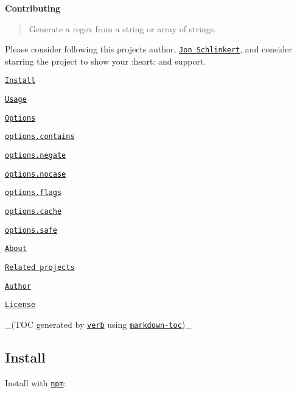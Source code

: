 {\bfseries Contributing}

\begin{quote}
Generate a regex from a string or array of strings. \end{quote}


Please consider following this project\textquotesingle{}s author, \href{https://github.com/jonschlinkert}{\tt Jon Schlinkert}, and consider starring the project to show your \+:heart\+: and support.


\begin{DoxyItemize}
\item \href{#install}{\tt Install}
\item \href{#usage}{\tt Usage}
\item \href{#options}{\tt Options}
\begin{DoxyItemize}
\item \href{#optionscontains}{\tt options.\+contains}
\item \href{#optionsnegate}{\tt options.\+negate}
\item \href{#optionsnocase}{\tt options.\+nocase}
\item \href{#optionsflags}{\tt options.\+flags}
\item \href{#optionscache}{\tt options.\+cache}
\item \href{#optionssafe}{\tt options.\+safe}
\end{DoxyItemize}
\item \href{#about}{\tt About}
\begin{DoxyItemize}
\item \href{#related-projects}{\tt Related projects}
\item \href{#author}{\tt Author}
\item \href{#license}{\tt License}
\end{DoxyItemize}
\end{DoxyItemize}

\+\_\+(T\+OC generated by \href{https://github.com/verbose/verb}{\tt verb} using \href{https://github.com/jonschlinkert/markdown-toc}{\tt markdown-\/toc})\+\_\+

\subsection*{Install}

Install with \href{https://www.npmjs.com/}{\tt npm}\+:




